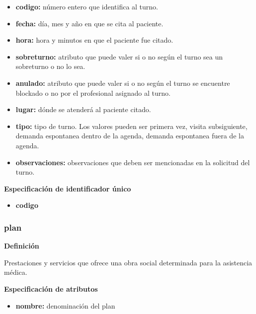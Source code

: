 \documentclass[a4paper,11pt]{article}
\begin{document}
\begin{itemize}

     \item \textbf{codigo:} número entero que identifica al turno.

     \item \textbf{fecha:} día, mes y año en que se cita al paciente.

     \item \textbf{hora:} hora y minutos en que el paciente fue citado.

     \item \textbf{sobreturno:} atributo que puede valer si o no según el turno sea un sobreturno 
     o no lo sea.

     \item \textbf{anulado:} atributo que puede valer si o no según el turno se encuentre blockado 
     o no por el profesional asignado al turno.

     \item \textbf{lugar:} dónde se atenderá al paciente citado.

     \item \textbf{tipo:} tipo de turno. Los valores pueden ser primera vez, visita subsiguiente, 
     demanda espontanea dentro de la agenda, demanda espontanea fuera de la agenda.

     \item \textbf{observaciones:} observaciones que deben ser mencionadas en la solicitud del turno.

\end{itemize}

\textbf{Especificación de identificador único}

\begin{itemize}

     \item \textbf{codigo}

\end{itemize}

\subsubsection{\textbf{plan}}

\textbf{Definición}

Prestaciones y servicios que ofrece una obra social determinada para la asistencia médica.

\textbf{Especificación de atributos}

\begin{itemize}

    \item \textbf{nombre:} denominación del plan

\end{itemize}
\end{document}
